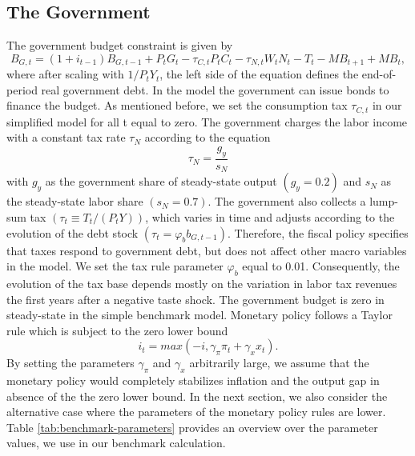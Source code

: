 \subsection*{The Government}

The government budget constraint is given by
\begin{equation}
B_{G,t} = \left(1 + i_{t-1}\right)B_{G,t-1} + P_tG_t - \tau_{C,t}P_tC_t - \tau_{N,t}W_tN_t - T_t - MB_{t+1} + MB_t,  \nonumber
\end{equation}
where after scaling with $1/ P_tY_t$, the left side of the equation defines the end-of-period real government debt. In the model the government can issue bonds to finance the budget. As mentioned before, we set the consumption tax $\tau_{C,t}$ in our simplified model for all t equal to zero. The government charges the labor income with a constant tax rate $\tau_N$ according to the equation \[\tau_N = \frac{g_y}{s_N}\] with $g_y$ as the government share of steady-state output $\left(g_y = 0.2 \right)$ and $s_N$ as the steady-state labor share $\left(s_N = 0.7\right)$.
The government also collects a lump-sum tax $\left(\tau_t \equiv T_t/(P_tY)\right)$, which varies in time and adjusts according to the evolution of the debt stock $\left(\tau_t = \varphi_b b_{G,t-1}\right)$. Therefore, the fiscal policy specifies that taxes respond to government debt, but does not affect other macro variables in the model. We set the tax rule parameter $\varphi_b$ equal to 0.01. Consequently, the evolution of the tax base depends mostly on the variation in labor tax revenues the first years after a negative taste shock. The government budget is zero in steady-state in the simple benchmark model.\newline
Monetary policy follows a Taylor rule which is subject to the zero lower bound
\begin{equation}
i_t = max \left(-i, \gamma_{\pi} \pi_t + \gamma_x x_t\right)  \nonumber.
\end{equation}
By setting the parameters $\gamma_{\pi}$ and $\gamma_x$ arbitrarily large, we assume that the monetary policy would completely stabilizes inflation and the output gap in absence of the the zero lower bound. In the next section, we also consider the alternative case where the parameters of the monetary policy rules are lower.\newline
Table \ref{tab:benchmark-parameters} provides an overview over the parameter values, we use in our benchmark calculation.
\bigskip
